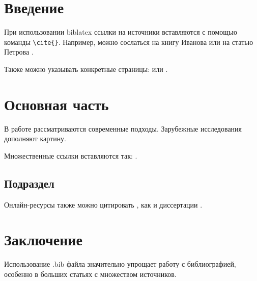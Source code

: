 \documentclass[12pt]{article}
\begin{document}
\section{Введение}

При использовании biblatex ссылки на источники вставляются с помощью команды \texttt{\textbackslash cite\{\}}. Например, можно сослаться на книгу Иванова \cite{ivanov2020} или на статью Петрова \cite{petrov2021}.

Также можно указывать конкретные страницы: \cite[с. 25]{smith2019} или \cite[p. 50]{johnson2020}.

\section{Основная часть}

В работе \cite{sidorov2022} рассматриваются современные подходы. Зарубежные исследования \cite{brown2021} дополняют картину.

Множественные ссылки вставляются так: \cite{ivanov2020, petrov2021, smith2019}.

\subsection{Подраздел}

Онлайн-ресурсы также можно цитировать \cite{webresource2023}, как и диссертации \cite{nikolaev2018}.

\section{Заключение}

Использование .bib файла значительно упрощает работу с библиографией, особенно в больших статьях с множеством источников.


\printbibliography[title={\centering\textbf{Список литературы}}]

%
%
%
\end{document}
